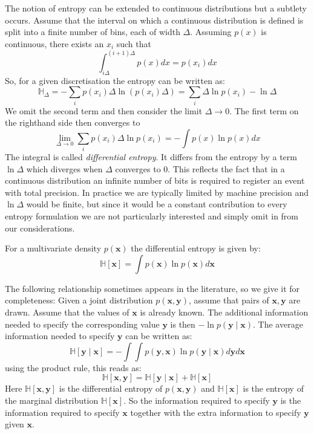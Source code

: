 The notion of entropy can be extended to continuous distributions but a subtlety occurs. Assume that the interval on which a continuous distribution is defined
is split into a finite number of bins, each of width $\Delta$. 
Assuming $p(x)$ is continuous, there exists an $x_i$ such that
$$
\int^{(i+1)\Delta}_{i\Delta} p(x) dx = p(x_i) dx 
$$
So, for a given discretisation the entropy can be written as:
$$
\mathbb{H}_{\Delta} = - \sum_i p(x_i) \Delta \ln(p(x_i) \Delta) = \sum_i \Delta \ln p(x_i) - \ln \Delta
$$
We omit the second term and then consider the limit $\Delta \rightarrow 0$. The first term on the righthand side then converges to
$$
\lim_{\Delta \rightarrow 0} \sum_i p(x_i) \Delta \ln p(x_i) = - \int p(x) \ln p(x) dx
$$
The integral is called \emph{differential entropy}. It differs from the entropy by a term $\ln \Delta$ which diverges when $\Delta$ converges to 0. This
reflects the fact that in a continuous distribution an infinite number of bits is required to register an event with total precision. In practice we are
typically limited by machine precision and $\ln \Delta$ would be finite, but since it would be a constant contribution to every entropy formulation we are
not particularly interested and simply omit in from our considerations.

For a multivariate density $p(\boldsymbol{x})$ the differential entropy is given by:
$$
\mathbb{H}[\boldsymbol{x}] = \int p(\boldsymbol{x}) \ln p(\boldsymbol{x}) d \boldsymbol{x}
$$


The following relationship sometimes appears in the literature, so we give it for completeness:
Given a joint distribution $p(\boldsymbol{x}, \boldsymbol{y})$, assume that pairs of $\boldsymbol{x}, \boldsymbol{y}$ are drawn. Assume that
the values of $\boldsymbol{x}$ is already known. The additional information needed to specify the corresponding value $\boldsymbol{y}$ is then
$-\ln p(\boldsymbol{y} \mid \boldsymbol{x})$. The average information needed to specify $\boldsymbol{y}$ can be written as:
$$
\mathbb{H}[\boldsymbol{y} \mid \boldsymbol{x}] = - \int \int p(\boldsymbol{y}, \boldsymbol{x}) \ln p(\boldsymbol{y} \mid \boldsymbol{x}) d \boldsymbol{y} d \boldsymbol{x}
$$
using the product rule, this reads as:
$$
\mathbb{H}[\boldsymbol{x}, \boldsymbol{y} ] = \mathbb{H}[ \boldsymbol{y} \mid \boldsymbol{x} ] + \mathbb{H}[\boldsymbol{x}]
$$
Here $\mathbb{H}[\boldsymbol{x}, \boldsymbol{y}]$ is the differential entropy of $p(\boldsymbol{x}, \boldsymbol{y})$ and $\mathbb{H}[\boldsymbol{x}]$ is the
entropy of the marginal distribution $\mathbb{H}[\boldsymbol{x}]$. So the information required to specify $\boldsymbol{y}$ is the information required to
specify $\boldsymbol{x}$ together with the extra information to specify $\boldsymbol{y}$ given $\boldsymbol{x}$.
